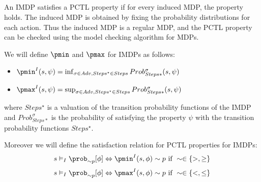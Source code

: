 \subsection{}

An IMDP satisfies a PCTL property if for every induced MDP, the property holds.
The induced MDP is obtained by fixing the probability distributions for
each action. Thus the induced MDP is a regular MDP, and the PCTL property can
be checked using the model checking algorithm for MDPs.

We will define $\pmin$ and $\pmax$ for IMDPs as follows:
\begin{itemize}
	\item $\pmin^{I}(s, \psi) = \inf_{\sigma \in Adv,Steps^\star \in Steps}Prob^{\sigma}_{Steps*}(s, \psi)$
	\item $\pmax^{I}(s, \psi) = \sup_{\sigma \in Adv,Steps^\star \in Steps}Prob^{\sigma}_{Steps*}(s, \psi)$
\end{itemize}
where $Steps^\star$ is a valuation of the transition probability functions of
the IMDP and $Prob^{\sigma}_{Steps*}$ is the probability of satisfying the
property $\psi$ with the transition probability functions $Steps^\star$.

Moreover we will define the satisfaction relation for PCTL properties for IMDPs:
\[
	s \vDash_I \prob_{\sim p}[\phi] \Leftrightarrow \pmin^{I}(s, \phi) \sim p \text{ if } \sim \in \{ >, \ge \}
\]
\[
	s \vDash_I \prob_{\sim p}[\phi] \Leftrightarrow \pmax^{I}(s, \phi) \sim p \text{ if } \sim \in \{ <, \le \}
\]

\subsubsection{}

